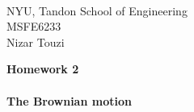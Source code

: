 \documentclass{article}
\begin{document}
\begin{flushleft}  
$~~$

\vspace{-20mm}

$\!\!\!\!\!\!\!\!\!\!\!\!\!\!\!\!\!\!\!\!\!\!\!\!\!\!\!\!\!\!\!\!$NYU, Tandon School of Engineering
\\
$\!\!\!\!\!\!\!\!\!\!\!\!\!\!\!\!\!\!\!\!\!\!\!\!\!\!\!\!\!\!\!\!$MSFE6233
\\
$\!\!\!\!\!\!\!\!\!\!\!\!\!\!\!\!\!\!\!\!\!\!\!\!\!\!\!\!\!\!\!\!$Nizar Touzi
\end{flushleft}

\vspace{5mm}

\begin{center}
{\large\bf Homework 2  
\\ ~~\\
The Brownian motion}
\end{center}
\end{document}
